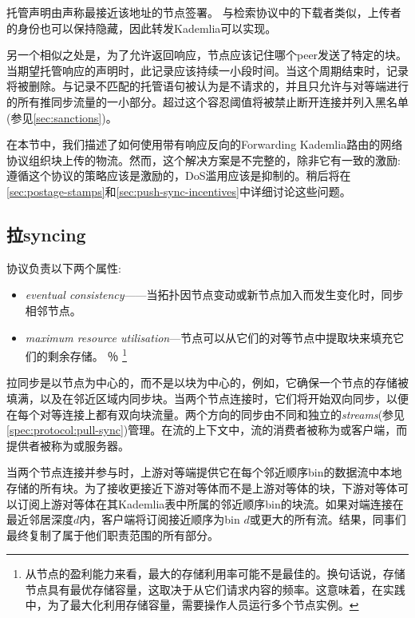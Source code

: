 托管声明由声称最接近该地址的节点签署。
与检索协议中的下载者类似，上传者的身份也可以保持隐藏，因此转发Kademlia可以实现。

另一个相似之处是，为了允许返回响应，节点应该记住哪个peer发送了特定的块。当期望托管响应的声明时，此记录应该持续一小段时间。当这个周期结束时，记录将被删除。与记录不匹配的托管语句被认为是不请求的，并且只允许与对等端进行的所有推同步流量的一小部分。超过这个容忍阈值将被禁止断开连接并列入黑名单(参见\ref{sec:sanctions})。

在本节中，我们描述了如何使用带有响应反向的Forwarding Kademlia路由的网络协议组织块上传的物流。然而，这个解决方案是不完整的，除非它有一致的激励:遵循这个协议的策略应该是激励的，DoS滥用应该是抑制的。稍后将在\ref{sec:postage-stamps}和\ref{sec:push-sync-incentives}中详细讨论这些问题。

\subsection{拉syncing\statusgreen}\label{sec:pull-syncing}

协议负责以下两个属性: 

\begin{itemize}
    \item \emph{eventual consistency}——当拓扑因节点变动或新节点加入而发生变化时，同步相邻节点。
    \item \emph{maximum resource utilisation}—节点可以从它们的对等节点中提取块来填充它们的剩余存储。%
％
\footnote{从节点的盈利能力来看，最大的存储利用率可能不是最佳的。换句话说，存储节点具有最优存储容量，这取决于从它们请求内容的频率。这意味着，在实践中，为了最大化利用存储容量，需要操作人员运行多个节点实例。}
\end{itemize}

拉同步是以节点为中心的，而不是以块为中心的，例如，它确保一个节点的存储被填满，以及在邻近区域内同步块。当两个节点连接时，它们将开始双向同步，以便在每个对等连接上都有双向块流量。两个方向的同步由不同和独立的\emph{streams}(参见\ref{spec:protocol:pull-sync})管理。在流的上下文中，流的消费者被称为或客户端，而提供者被称为或服务器。 

当两个节点连接并参与时，上游对等端提供它在每个邻近顺序bin的数据流中本地存储的所有块。为了接收更接近下游对等体而不是上游对等体的块，下游对等体可以订阅上游对等体在其Kademlia表中所属的邻近顺序bin的块流。如果对端连接在最近邻居深度$d$内，客户端将订阅接近顺序为bin $d$或更大的所有流。结果，同事们最终复制了属于他们职责范围的所有部分。

